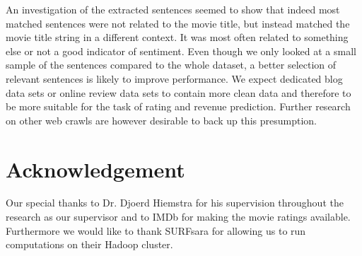\documentclass{sig-alternate-br}
\begin{document}
An investigation of the extracted sentences seemed to show that indeed most matched sentences were not related to the movie title, but instead matched the movie title string in a different context. It was most often related to something else or not a good indicator of sentiment. Even though we only looked at a small sample of the sentences compared to the whole dataset, a better selection of relevant sentences is likely to improve performance. We expect dedicated blog data sets or online review data sets to contain more clean data and therefore to be more suitable for the task of rating and revenue prediction. Further research on other web crawls are however desirable to back up this presumption.

\section{Acknowledgement}
Our special thanks to Dr. Djoerd Hiemstra for his supervision throughout the research as our supervisor and to IMDb for making the movie ratings available. Furthermore we would like to thank SURFsara for allowing us to run computations on their Hadoop cluster.
%




\balancecolumns

\onecolumn
\end{document}
